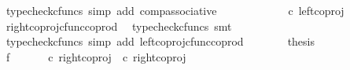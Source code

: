 \begin{isabellebody}
\ {\isacharparenleft}{\kern0pt}typecheck{\isacharunderscore}{\kern0pt}cfuncs{\isacharcomma}{\kern0pt}\ simp\ add{\isacharcolon}{\kern0pt}\ comp{\isacharunderscore}{\kern0pt}associative{}{\isacharparenright}{\kern0pt}\isanewline
\ \ \ \ \isamarkupfalse%
\ \isamarkupfalse%
\ {\isachardoublequoteopen}{\isachardot}{\kern0pt}{\isachardot}{\kern0pt}{\isachardot}{\kern0pt}\ {\isacharequal}{\kern0pt}\ {\isasymlangle}{\isasymt}{\isacharcomma}{\kern0pt}{\isasymf}{\isasymrangle}\ {\isasymamalg}\ {\isasymlangle}{\isasymf}{\isacharcomma}{\kern0pt}{\isasymt}{\isasymrangle}\ {\isasymcirc}\isactrlsub c\ left{\isacharunderscore}{\kern0pt}coproj\ {\isasymone}\ {\isasymone}{\isachardoublequoteclose}\isanewline
\ \ \ \ \ \ \isamarkupfalse%
\ right{\isacharunderscore}{\kern0pt}coproj{\isacharunderscore}{\kern0pt}cfunc{\isacharunderscore}{\kern0pt}coprod\ \isamarkupfalse%
\ {\isacharparenleft}{\kern0pt}typecheck{\isacharunderscore}{\kern0pt}cfuncs{\isacharcomma}{\kern0pt}\ smt{\isacharparenright}{\kern0pt}\isanewline
\ \ \ \ \isamarkupfalse%
\ \isamarkupfalse%
\ {\isachardoublequoteopen}{\isachardot}{\kern0pt}{\isachardot}{\kern0pt}{\isachardot}{\kern0pt}\ {\isacharequal}{\kern0pt}\ {\isasymlangle}{\isasymt}{\isacharcomma}{\kern0pt}{\isasymf}{\isasymrangle}{\isachardoublequoteclose}\isanewline
\ \ \ \ \ \ \isamarkupfalse%
\ {\isacharparenleft}{\kern0pt}typecheck{\isacharunderscore}{\kern0pt}cfuncs{\isacharcomma}{\kern0pt}\ simp\ add{\isacharcolon}{\kern0pt}\ left{\isacharunderscore}{\kern0pt}coproj{\isacharunderscore}{\kern0pt}cfunc{\isacharunderscore}{\kern0pt}coprod{\isacharparenright}{\kern0pt}\isanewline
\ \ \ \ \isamarkupfalse%
\ \isamarkupfalse%
\ {\isacharquery}{\kern0pt}thesis\isacommand{{\isachardot}{\kern0pt}}\isamarkupfalse%
\isanewline
\ \ \isamarkupfalse%
\isanewline
\ \ \isamarkupfalse%
\ f{}{\isacharcolon}{\kern0pt}\ {\isachardoublequoteopen}{\isasymlangle}{\isasymf}{\isacharcomma}{\kern0pt}\ {\isasymf}{\isasymrangle}\ {\isasymamalg}\ {\isasymlangle}{\isasymt}{\isacharcomma}{\kern0pt}{\isasymf}{\isasymrangle}\ {\isasymamalg}\ {\isasymlangle}{\isasymf}{\isacharcomma}{\kern0pt}{\isasymt}{\isasymrangle}\ {\isasymcirc}\isactrlsub c\ {\isacharparenleft}{\kern0pt}right{\isacharunderscore}{\kern0pt}coproj\ {\isasymone}\ {\isacharparenleft}{\kern0pt}{\isasymone}{\isasymCoprod}{\isasymone}{\isacharparenright}{\kern0pt}{\isasymcirc}\isactrlsub c\ right{\isacharunderscore}{\kern0pt}coproj\ {\isasymone}\ {\isasymone}{\isacharparenright}{\kern0pt}\ {\isacharequal}{\kern0pt}\ {\isasymlangle}{\isasymf}{\isacharcomma}{\kern0pt}{\isasymt}{\isasymrangle}{\isachardoublequoteclose}\isanewline

\end{isabellebody}
